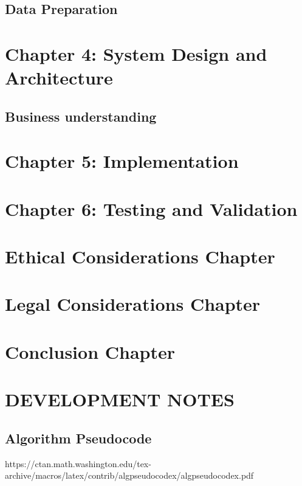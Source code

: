 \documentclass[preprint,12pt,review,authoryear]{elsarticle}
\begin{document}
\subsection{Data Preparation}

\section{Chapter 4: System Design and Architecture}

\subsection{Business understanding}



\section{Chapter 5: Implementation}



\section{Chapter 6: Testing and Validation}

\section{Ethical Considerations Chapter}

\section{Legal Considerations Chapter}

\section{Conclusion Chapter}




\section{DEVELOPMENT NOTES}

\subsection{Algorithm Pseudocode}
https://ctan.math.washington.edu/tex-archive/macros/latex/contrib/algpseudocodex/algpseudocodex.pdf
\end{document}
